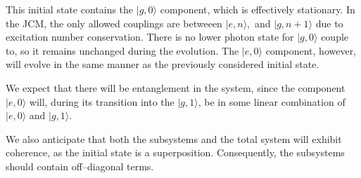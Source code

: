 \documentclass[12pt]{article}
\begin{document}
This initial state contains the $|g,0\rangle$ component, which is effectively stationary. In the JCM, the only allowed couplings are betweeen $|e,n\rangle,$ and $|g,n+1\rangle$ due to excitation number conservation. There is no lower photon state for $|g,0\rangle$ couple to,  so it remains unchanged during the evolution. The $|e,0\rangle$ component, however, will evolve in the same manner as the previously considered initial state. 

We expect that there will be entanglement in the system, since the component $|e,0\rangle$ will, during its transition into the $|g,1\rangle$, be in some linear combination of $|e,0\rangle$ and $|g,1\rangle$. 

We also anticipate that both the subsystems and the total system will exhibit coherence, as the initial state is a superposition. Consequently, the subsystems should contain off--diagonal terms.\\
\end{document}
